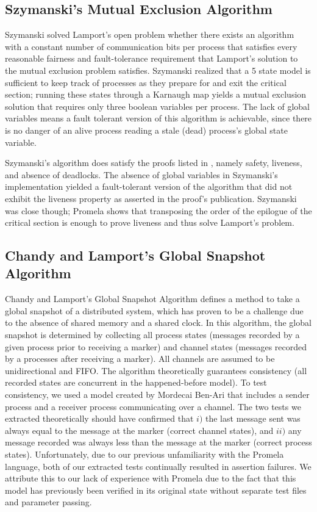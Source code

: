 \documentclass[12pt]{article}
\begin{document}
\begin{flushleft}
\subsection{Szymanski's Mutual Exclusion Algorithm}
Szymanski solved Lamport's open problem whether there exists an algorithm with a
constant number of communication bits per process that satisfies every
reasonable fairness and fault-tolerance requirement that Lamport's solution to
the mutual exclusion problem satisfies. Szymanski realized that a 5 state model
is sufficient to keep track of processes as they prepare for and exit the
critical section; running these states through a Karnaugh map yields a mutual
exclusion solution that requires only three boolean variables per process. The
lack of global variables means a fault tolerant version of this algorithm is
achievable, since there is no danger of an alive process reading a stale (dead)
process's global state variable.

Szymanski's algorithm does satisfy the proofs listed in \cite{szymanski:acm},
namely safety, liveness, and absence of deadlocks. The absence of global
variables in Szymanski's implementation yielded a fault-tolerant version of the
algorithm that did not exhibit the liveness property as asserted in the proof's
publication. Szymanski was close though; Promela shows that transposing the
order of the epilogue of the critical section is enough to prove liveness and
thus solve Lamport's problem.

\subsection{Chandy and Lamport's Global Snapshot Algorithm}
Chandy and Lamport's Global Snapshot Algorithm defines a method to take a global
snapshot of a distributed system, which has proven to be a challenge due to the
absence of shared memory and a shared clock. In this algorithm, the global
snapshot is determined by collecting all process states (messages recorded by a
given process prior to receiving a marker) and channel states (messages recorded
by a processes after receiving a marker). All channels are assumed to be
unidirectional and FIFO. The algorithm theoretically guarantees consistency (all
recorded states are concurrent in the happened-before model). To test
consistency, we used a model created by Mordecai Ben-Ari \cite{ben-ari} that
includes a sender process and a receiver process communicating over a
channel. The two tests we extracted theoretically should have confirmed that
$i)$ the last message sent was always equal to the message at the marker
(correct channel states), and $ii)$ any message recorded was always less than
the message at the marker (correct process states). Unfortunately, due to our
previous unfamiliarity with the Promela language, both of our extracted tests
continually resulted in assertion failures. We attribute this to our lack of
experience with Promela due to the fact that this model has previously been
verified in its original state without separate test files and parameter
passing.


\end{flushleft}
\end{document}
